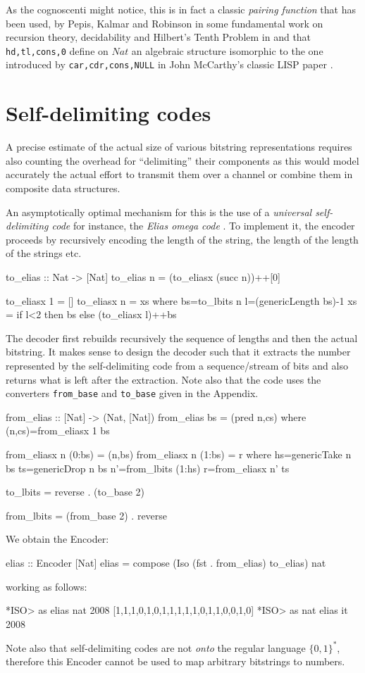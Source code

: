 \documentclass[]{INCLUDES/llncs}
\begin{document}
As the cognoscenti might notice, this is in fact a classic {\em pairing
function} that has been used, by Pepis, Kalmar and Robinson 
in some fundamental work on recursion theory, 
decidability and Hilbert's Tenth Problem in
\cite{pepis,kalmar1,kalmar2,kalmar3,robinson50,robinson68a,robinsons68b} and
that {\tt hd,tl,cons,0} define on $Nat$ an algebraic structure isomorphic to the
one introduced by {\tt car,cdr,cons,NULL} in John McCarthy's classic LISP paper
\cite{mccarthy60}.

\section{Self-delimiting codes} \label{selfdelim}
A precise estimate of the actual size of various bitstring representations
requires also counting the overhead for ``delimiting'' their components
as this would model accurately the actual effort to transmit them over
a channel or combine them in composite data structures.

An asymptotically optimal mechanism for this is the use of a {\em universal
self-delimiting code} for instance, the {\em Elias omega code} \cite{elias75}.
To implement it, the encoder proceeds by recursively encoding the length of the
string, the length of the length of the strings etc.
\begin{code}
to_elias :: Nat -> [Nat]
to_elias n = (to_eliasx (succ n))++[0]

to_eliasx 1 = []
to_eliasx n = xs where
  bs=to_lbits n
  l=(genericLength bs)-1
  xs = if l<2 then bs else (to_eliasx l)++bs
\end{code}
The decoder first rebuilds recursively the
sequence of lengths and then the actual bitstring.
It makes sense to design the decoder such that it extracts the number
represented by the self-delimiting code from a sequence/stream 
of bits and also returns what is left after the extraction. Note also
that the code uses the converters {\tt from\_base} and {\tt to\_base}
given in the Appendix.
\begin{code}
from_elias :: [Nat] -> (Nat, [Nat])
from_elias bs = (pred n,cs) where (n,cs)=from_eliasx 1 bs

from_eliasx n (0:bs) = (n,bs)
from_eliasx n (1:bs) = r where 
  hs=genericTake n bs
  ts=genericDrop n bs
  n'=from_lbits (1:hs)
  r=from_eliasx n' ts 

to_lbits = reverse . (to_base 2)

from_lbits = (from_base 2) . reverse
\end{code}
We obtain the Encoder:
\begin{code}
elias :: Encoder [Nat]
elias = compose (Iso (fst . from_elias) to_elias) nat
\end{code}
working as follows:
\begin{codex}
*ISO> as elias nat 2008
[1,1,1,0,1,0,1,1,1,1,1,0,1,1,0,0,1,0]
*ISO> as nat elias it
2008
\end{codex}
Note also that self-delimiting codes are not {\em onto} the regular
language $\{0,1\}^*$, therefore this Encoder cannot be used to map arbitrary bitstrings
to numbers.
\end{document}
